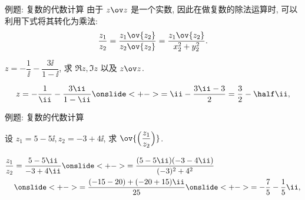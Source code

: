 \begin{frame}{例题: 复数的代数计算}
	\onslide<+->
	由于 $z\ov z$ 是一个实数,
	\onslide<+->
	因此在做复数的除法运算时, 可以利用下式将其转化为乘法:
	\[
		\dfrac{z_1}{z_2}=\dfrac{z_1\ov{z_2}}{z_2\ov{z_2}}=\dfrac{z_1\ov{z_2}}{x_2^2+y_2^2}.
	\]
	\bigdel
	\onslide<+->
	\begin{example}[nearnext]
		$z=-\dfrac1\ii-\dfrac{3\ii}{1-\ii }$, 求 $\Re z,\Im z$ 以及 $z\ov z$.
	\end{example}
	\onslide<+->
	\begin{solution}[nearprev]
		\[
			z=-\frac1\ii-\frac{3\ii}{1-\ii }
			\onslide<+->{=\ii-\frac{3\ii-3}2=\frac32-\half \ii,}
		\]
		\onslide<+->{%
		\[
			\Re z=\frac32,\quad\Im z=-\half ,\quad
			z\ov z=\Bigl(\frac32\Bigr)^2+\Bigl(-\half\Bigr)^2=\frac52.
		\]
		}
		\bigdel
	\end{solution}
\end{frame}


\begin{frame}{例题: 复数的代数计算}
	\onslide<+->
	\begin{example}[nearnext]
		设 $z_1=5-5\ii,z_2=-3+4\ii$, 求 $\ov{\Bigl(\dfrac{z_1}{z_2}\Bigr)}$.
	\end{example}
	\onslide<+->
	\begin{solution}[nearprev]
		\begin{align*}
			\frac{z_1}{z_2}&=\frac{5-5\ii}{-3+4\ii}
			\onslide<+->{=\frac{(5-5\ii)(-3-4\ii)}{(-3)^2+4^2}}\\
			&\onslide<+->{=\frac{(-15-20)+(-20+15)\ii}{25}}
			\onslide<+->{=-\frac75-\frac15\ii,}
		\end{align*}
		\onslide<+->{%
			因此 $\ov{\Bigl(\dfrac{z_1}{z_2}\Bigr)}=-\dfrac75+\dfrac15\ii$.
		}
	\end{solution}
\end{frame}
